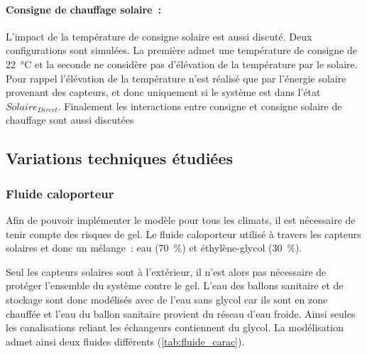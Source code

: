 \paragraph{Consigne de chauffage solaire~:} %
\label{par:consigne_de_chauffage_solaire}
L’impact de la température de consigne solaire est aussi discuté. Deux configurations sont
simulées. La première admet une température de consigne de \SI{22}{\celsius} et la seconde
ne considère pas d’élévation de la température par le solaire. Pour rappel l’élévation de
la température n’est réalisé que par l’énergie solaire provenant des capteurs, et donc
uniquement si le système est dans l’état $Solaire_{Direct}$. Finalement les interactions
entre consigne et consigne solaire de chauffage sont aussi discutées


\subsection{Variations techniques étudiées} %
\label{sub:variations_techniques_etudiees}
\subsubsection{Fluide caloporteur} %
\label{ssub:fluide_caloporteur}
Afin de pouvoir implémenter le modèle pour tous les climats, il est nécessaire de
tenir compte des risques de gel. Le fluide caloporteur utilisé à travers les capteurs
solaires et donc un mélange~: eau (\SI{70}{\percent}) et éthylène-glycol (\SI{30}{\percent}).

Seul les capteurs solaires sont à l’extérieur, il n’est alors pas nécessaire
de protéger l’ensemble du système contre le gel. L’eau des ballons sanitaire et de stockage
sont donc  modélisés avec de l’eau sans glycol car ils sont en zone chauffée et l’eau du ballon
sanitaire provient du réseau d’eau froide. Ainsi seules les canalisations reliant les échangeurs
contiennent du glycol. La modélisation admet ainsi deux fluides différents (\autoref{tab:fluide_carac}).


